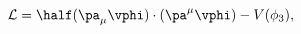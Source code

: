 \begin{equation}\label{Lag}
 {\cal L} = \half(\pa_\mu\vphi)\cdot(\pa^\mu\vphi)
               - V(\phi_3),
\end{equation}


